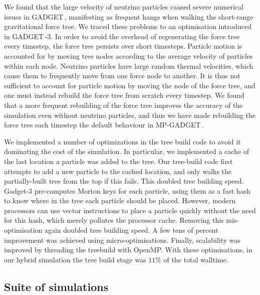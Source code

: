 \documentclass[useAMS, usenatbib]{mnras}
\newcommand{\gadget}{{\small GADGET\,}}
\begin{document}
We found that the large velocity of neutrino particles caused severe numerical issues in \gadget, manifesting as frequent hangs when walking the short-range gravitational force tree. We traced these problems to an optimisation introduced in \gadget-3. In order to avoid the overhead of regenerating the force tree every timestep, the force tree persists over short timesteps. Particle motion is accounted for by moving tree nodes according to the average velocity of particles within each node. Neutrino particles have large random thermal velocities, which cause them to frequently move from one force node to another. It is thus not sufficient to account for particle motion by moving the node of the force tree, and one must instead rebuild the force tree from scratch every timestep. We found that a more frequent rebuilding of the force tree improves the accuracy of the simulation even without neutrino particles, and thus we have made rebuilding the force tree each timestep the default behaviour in MP-\gadget.

We implemented a number of optimizations in the tree build code to avoid it dominating the cost of the simulation.
In particular, we implemented a cache of the last location a particle was added to the tree. Our tree-build code first attempts to add a new particle to the cached location, and only walks the partially-built tree from the top if this fails. This doubled tree building speed. Gadget-3 pre-computes Morton keys for each particle, using them as a fast hash to know where in the tree each particle should be placed. However, modern processors can use vector instructions to place a particle quickly without the need for this hash, which merely pollutes the processor cache. Removing this mis-optimisation again doubled tree building speed. A few tens of percent improvement was achieved using micro-optimisations. Finally, scalability was improved by threading the treebuild with OpenMP. With these optimisations, in our hybrid simulation the tree build stage was $11\%$ of the total walltime.

\subsection{Suite of simulations}
\end{document}
